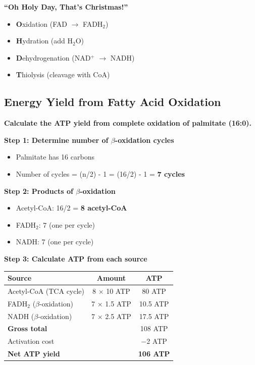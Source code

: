 \begin{tcolorbox}[colback=blue!5, colframe=blue!70!black, title=\textbf{Memory Aid: $\beta$-Oxidation Steps}]
\textbf{``Oh Holy Day, That's Christmas!''}
\begin{itemize}
    \item \textbf{O}xidation (FAD $\rightarrow$ FADH$_2$)
    \item \textbf{H}ydration (add H$_2$O)
    \item \textbf{D}ehydrogenation (NAD$^+$ $\rightarrow$ NADH)
    \item \textbf{T}hiolysis (cleavage with CoA)
\end{itemize}
\end{tcolorbox}

\subsection{Energy Yield from Fatty Acid Oxidation}

\begin{example}
\textbf{Calculate the ATP yield from complete oxidation of palmitate (16:0).}

\textbf{Step 1: Determine number of $\beta$-oxidation cycles}
\begin{itemize}
    \item Palmitate has 16 carbons
    \item Number of cycles = (n/2) - 1 = (16/2) - 1 = \textbf{7 cycles}
\end{itemize}

\textbf{Step 2: Products of $\beta$-oxidation}
\begin{itemize}
    \item Acetyl-CoA: 16/2 = \textbf{8 acetyl-CoA}
    \item FADH$_2$: 7 (one per cycle)
    \item NADH: 7 (one per cycle)
\end{itemize}

\textbf{Step 3: Calculate ATP from each source}

\begin{center}
\begin{tabular}{lcc}
\toprule
\textbf{Source} & \textbf{Amount} & \textbf{ATP} \\
\midrule
Acetyl-CoA (TCA cycle) & 8 $\times$ 10 ATP & 80 ATP \\
FADH$_2$ ($\beta$-oxidation) & 7 $\times$ 1.5 ATP & 10.5 ATP \\
NADH ($\beta$-oxidation) & 7 $\times$ 2.5 ATP & 17.5 ATP \\
\midrule
\textbf{Gross total} & & 108 ATP \\
Activation cost & & $-$2 ATP \\
\midrule
\textbf{Net ATP yield} & & \textbf{106 ATP} \\
\bottomrule
\end{tabular}
\end{center}
\end{example}

